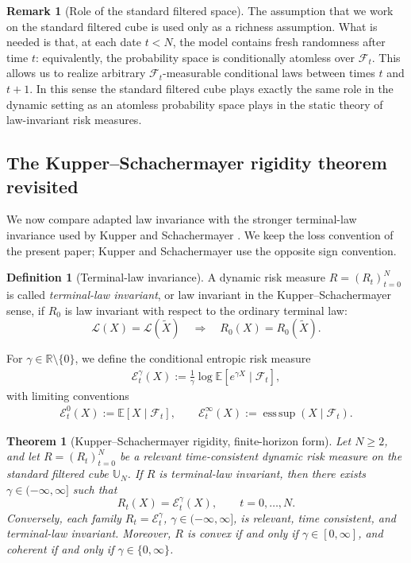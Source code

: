 \documentclass[a4paper]{amsart}
\newtheorem{theorem}{Theorem}[section]
\theoremstyle{definition}
\newtheorem{definition}[definition]{Definition}
\newtheorem{remark}[remark]{Remark}
\newcommand{\R}{\mathbb{R}}
\newcommand{\E}{\mathbb{E}}
\newcommand{\F}{\mathcal{F}}
\newcommand{\law}{\mathcal{L}}
\begin{document}
\begin{remark}[Role of the standard filtered space]
\label{rem:standard-filtered-space-role}
The assumption that we work on the standard filtered cube is used only as a
richness assumption. What is needed is that, at each date \(t<N\), the model
contains fresh randomness after time \(t\): equivalently, the probability space
is conditionally atomless over \(\F_t\). This allows us to realize arbitrary
\(\F_t\)-measurable conditional laws between times \(t\) and \(t+1\). In this
sense the standard filtered cube plays exactly the same role in the dynamic
setting as an atomless probability space plays in the static theory of
law-invariant risk measures.
\end{remark}

\subsection{The Kupper--Schachermayer rigidity theorem revisited}
\label{subsec:KS-revisited}

We now compare adapted law invariance with the stronger terminal-law
invariance used by Kupper and Schachermayer
\cite{KupperSchachermayer2009}. We keep the loss convention of the present
paper; Kupper and Schachermayer use the opposite sign convention.

\begin{definition}[Terminal-law invariance]
\label{def:terminal-law-invariance}
A dynamic risk measure \(R=(R_t)_{t=0}^N\) is called
\emph{terminal-law invariant}, or law invariant in the
Kupper--Schachermayer sense, if \(R_0\) is law invariant with respect to the
ordinary terminal law:
\[
\law(X)=\law(\widetilde X)\quad\Longrightarrow\quad R_0(X)=R_0(\widetilde X).
\]
\end{definition}

For \(\gamma\in\R\setminus\{0\}\), we define the conditional entropic risk measure 
\begin{align}
\mathcal E_t^\gamma(X)
:=
\frac1\gamma\log\E[e^{\gamma X}\mid\F_t],
\label{eq:KS-conditional-entropic}
\end{align}
with limiting conventions
\begin{align}
\mathcal E_t^0(X):=\E[X\mid\F_t],
\qquad
\mathcal E_t^\infty(X):=\operatorname{ess\,sup}(X\mid\F_t).
\label{eq:KS-conditional-entropic-limits}
\end{align}

\begin{theorem}[Kupper--Schachermayer rigidity, finite-horizon form]
\label{thm:KS-finite-rigidity}
Let \(N\ge2\), and let \(R=(R_t)_{t=0}^N\) be a relevant time-consistent
dynamic risk measure on the standard filtered cube \(\mathbb U_N\). If \(R\)
is terminal-law invariant, then there exists
\(\gamma\in(-\infty,\infty]\) such that
\[
R_t(X)=\mathcal E_t^\gamma(X),
\qquad t=0,\dots,N.
\]
Conversely, each family \(R_t=\mathcal E_t^\gamma\),
\(\gamma\in(-\infty,\infty]\), is relevant, time consistent, and
terminal-law invariant. Moreover, \(R\) is convex if and only if
\(\gamma\in[0,\infty]\), and coherent if and only if
\(\gamma\in\{0,\infty\}\).
\end{theorem}
\end{document}
